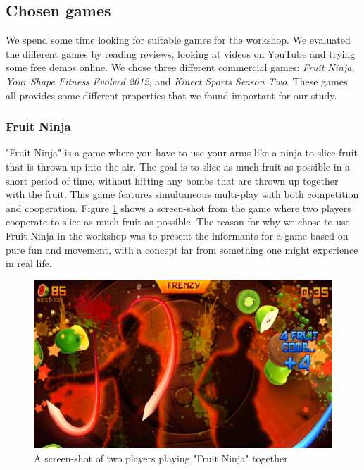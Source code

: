 \subsection{Chosen games}
\label{sec:chosengames}
We spend some time looking for suitable games for the workshop. We evaluated the different games by reading reviews, looking at videos on YouTube and trying some free demos online. We chose three different commercial games: \emph{Fruit Ninja}, \emph{Your Shape Fitness Evolved 2012}, and \emph{Kinect Sports Season Two}. These games all provides some different properties that we found important for our study.  

\subsubsection{Fruit Ninja}
"Fruit Ninja" is a game where you have to use your arms like a ninja to slice fruit that is thrown up into the air. The goal is to slice as much fruit as possible in a short period of time, without hitting any bombs that are thrown up together with the fruit. This game features simultaneous multi-play with both competition and cooperation. Figure \ref{fig:fruitninja} shows a screen-shot from the game where two players cooperate to slice as much fruit as possible. The reason for why we chose to use Fruit Ninja in the workshop was to present the informants for a game based on pure fun and movement, with a concept far from something one might experience in real life. 

\begin{figure} [H]
\centering
\includegraphics[scale=0.4]{fruitninja}
\caption[Fruit Ninja Multi-Play]{A screen-shot of two players playing "Fruit Ninja" together \cite{fruitninja}}
\label{fig:fruitninja}
\end{figure}

